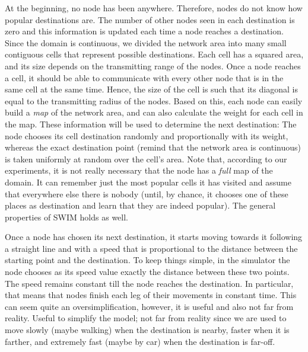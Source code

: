 \documentclass[conference]{IEEEtran}
\begin{document}
At the beginning, no node has been anywhere. Therefore, nodes do not know how
popular destinations are. The number of other nodes seen in each destination is
zero and this information is updated each time a node reaches a destination.
Since the domain is continuous, we divided the network area into many small
contiguous cells that represent possible destinations. Each cell has a squared
area, and its size depends on the transmitting range of the nodes. Once a node
reaches a cell, it should be able to communicate with every other node that is
in the same cell at the same time. Hence, the size of the cell is such that its
diagonal is equal to the transmitting radius of the nodes. Based on this, each
node can easily build a \emph{map} of the network area, and can also calculate
the weight for each cell in the map. These information will be used to
determine the next destination: The node chooses its cell
destination randomly and proportionally with its weight, whereas the exact
destination point (remind that the network area is continuous) is taken
uniformly at random over the cell's area. Note that,
according to our experiments, it is not really necessary that the node has a
\emph{full} map of the domain. It can remember just the most popular cells it
has visited and assume that everywhere else there is nobody (until, by chance,
it chooses one of these places as destination and learn that they are indeed
popular). The general properties of SWIM holds as well.

Once a node has chosen its next destination, it starts moving towards it
following a straight line and with a speed that is proportional to the distance
between the starting point and the destination. To keep things simple, in the
simulator the node chooses as its speed value exactly the distance between these
two points. The speed remains constant till the node reaches the destination. In
particular, that means that nodes finish each leg of their movements in constant
time. This can seem quite an oversimplification, however, it is useful and also
not far from reality. Useful to simplify the model; not far from reality since
we are used to move slowly (maybe walking) when the destination is nearby,
faster when it is farther, and extremely fast (maybe by car) when the
destination is far-off.
\end{document}
